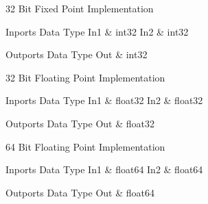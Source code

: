 32 Bit Fixed Point Implementation

\begin{XtoCtabular}{Inports Data Type}
In1 & int32\tabularnewline
\hline
In2 & int32\tabularnewline
\hline
\end{XtoCtabular}

\begin{XtoCtabular}{Outports Data Type}
Out & int32\tabularnewline
\hline
\end{XtoCtabular}

\ifdefined \AddTestReports
{}
\fi
{}
\nopagebreak[0]

32 Bit Floating Point Implementation

\begin{XtoCtabular}{Inports Data Type}
In1 & float32\tabularnewline
\hline
In2 & float32\tabularnewline
\hline
\end{XtoCtabular}

\begin{XtoCtabular}{Outports Data Type}
Out & float32\tabularnewline
\hline
\end{XtoCtabular}

\ifdefined \AddTestReports
{}
\fi
{}
\nopagebreak[0]

64 Bit Floating Point Implementation

\begin{XtoCtabular}{Inports Data Type}
In1 & float64\tabularnewline
\hline
In2 & float64\tabularnewline
\hline
\end{XtoCtabular}

\begin{XtoCtabular}{Outports Data Type}
Out & float64\tabularnewline
\hline
\end{XtoCtabular}

\ifdefined \AddTestReports
{}
\fi
